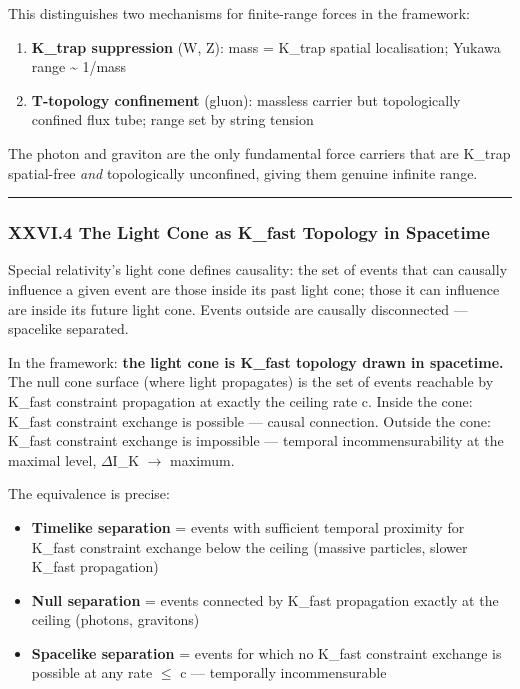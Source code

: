 \documentclass[12pt,a4paper]{article}
\begin{document}
This distinguishes two mechanisms for finite-range forces in the framework:

\begin{enumerate}
    \item \textbf{K\_trap suppression} (W, Z): mass = K\_trap spatial localisation; Yukawa range \textasciitilde{} 1/mass
    \item \textbf{T-topology confinement} (gluon): massless carrier but topologically confined flux tube; range set by string tension
\end{enumerate}

The photon and graviton are the only fundamental force carriers that are K\_trap spatial-free \emph{and} topologically unconfined, giving them genuine infinite range.

\begin{center}
\rule{0.5\textwidth}{0.4pt}
\end{center}

\subsubsection{XXVI.4 The Light Cone as K\_fast Topology in Spacetime}

Special relativity's light cone defines causality: the set of events that can causally influence a given event are those inside its past light cone; those it can influence are inside its future light cone. Events outside are causally disconnected --- spacelike separated.

In the framework: \textbf{the light cone is K\_fast topology drawn in spacetime.} The null cone surface (where light propagates) is the set of events reachable by K\_fast constraint propagation at exactly the ceiling rate c. Inside the cone: K\_fast constraint exchange is possible --- causal connection. Outside the cone: K\_fast constraint exchange is impossible --- temporal incommensurability at the maximal level, $\Delta$I\_K $\rightarrow$ maximum.

The equivalence is precise:

\begin{itemize}
    \item \textbf{Timelike separation} = events with sufficient temporal proximity for K\_fast constraint exchange below the ceiling (massive particles, slower K\_fast propagation)
    \item \textbf{Null separation} = events connected by K\_fast propagation exactly at the ceiling (photons, gravitons)
    \item \textbf{Spacelike separation} = events for which no K\_fast constraint exchange is possible at any rate $\leq$ c --- temporally incommensurable
\end{itemize}
\end{document}
